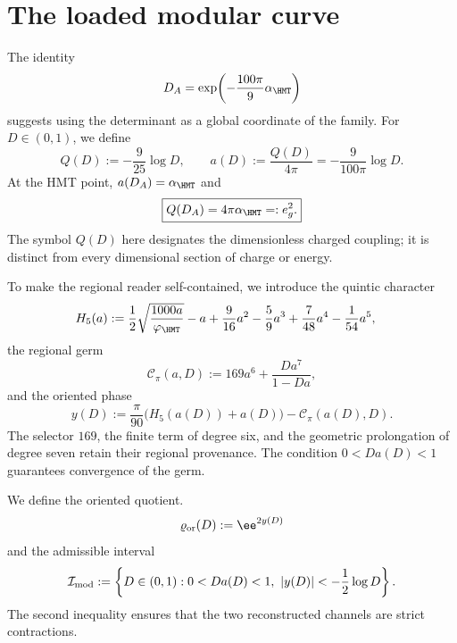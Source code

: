 \section{The loaded modular curve}

The identity
\begin{equation}
 D_A=\exp\!\left(-\frac{100\pi}{9}\alpha_{\HMT}\right)
 \label{rm:eq:curve-D-alpha}
\end{equation}
suggests using the determinant as a global coordinate of the family. For
\(D\in(0,1)\), we define
\begin{equation}
 \boxed{
 Q(D):=-\frac9{25}\log D,}
 \qquad
 a(D):=\frac{Q(D)}{4\pi}
 =-\frac9{100\pi}\log D.
 \label{rm:eq:curve-Q-a}
\end{equation}
At the HMT point, \(a(D_A)=\alpha_{\HMT}\) and
\begin{equation}
 \boxed{Q(D_A)=4\pi\alpha_{\HMT}=:e_g^2.}
 \label{rm:eq:curve-Q-gauge}
\end{equation}
The symbol \(Q(D)\) here designates the dimensionless charged coupling;
it is distinct from every dimensional section of charge or energy.

To make the regional reader self-contained, we introduce the quintic
character
\begin{equation}
 \begin{aligned}
 H_5(a):={}&\frac12\sqrt{\frac{1000a}{\varphi_{\HMT}}}-a
 +\frac9{16}a^2-\frac59a^3
 +\frac7{48}a^4-\frac1{54}a^5,
 \end{aligned}
 \label{rm:eq:curve-H5}
\end{equation}
the regional germ
\begin{equation}
 \mathcal C_\pi(a,D)
 :=169a^6+\frac{Da^7}{1-Da},
 \label{rm:eq:curve-Cpi}
\end{equation}
and the oriented phase
\begin{equation}
 y(D):=\frac{\pi}{90}\bigl(H_5(a(D))+a(D)\bigr)
 -\mathcal C_\pi(a(D),D).
 \label{rm:eq:curve-yD}
\end{equation}
The selector \(169\), the finite term of degree six, and
the geometric prolongation of degree seven retain
their regional provenance. The condition \(0<Da(D)<1\)
guarantees convergence of the germ.

We define the oriented quotient.
\begin{equation}
 \varrho_{\rm or}(D):=\ee^{2y(D)}
 \label{rm:eq:curve-rho-or}
\end{equation}
and the admissible interval
\begin{equation}
 \mathcal I_{\rm mod}:=
 \left\{D\in(0,1):
 0<Da(D)<1,
 \ |y(D)|<-\frac12\log D
 \right\}.
 \label{rm:eq:curve-domain}
\end{equation}
The second inequality ensures that the two reconstructed channels are strict contractions.

